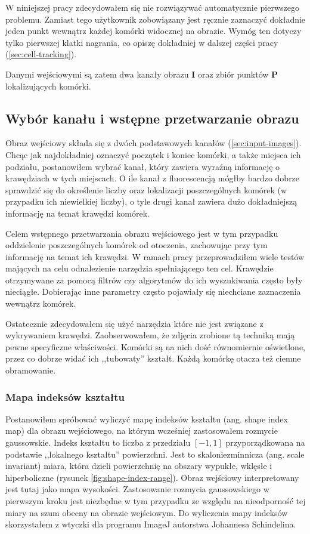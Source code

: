 \documentclass[declaration,shortabstract,mgr]{iithesis}
\newcommand{\image}{\mathbf{I}}
\begin{document}
W niniejszej pracy zdecydowałem się nie rozwiązywać automatycznie pierwszego problemu.
Zamiast tego użytkownik zobowiązany jest ręcznie zaznaczyć dokładnie jeden punkt wewnątrz każdej komórki widocznej na obrazie.
Wymóg ten dotyczy tylko pierwszej klatki nagrania, co opiszę dokładniej w dalszej części pracy (\ref{sec:cell-tracking}).

Danymi wejściowymi są zatem dwa kanały obrazu $\image$ oraz zbiór punktów $\mathbf{P}$ lokalizujących komórki.

\subsection{Wybór kanału i wstępne przetwarzanie obrazu}

Obraz wejściowy składa się z dwóch podstawowych kanałów (\ref{sec:input-images}).
Chcąc jak najdokładniej oznaczyć początek i koniec komórki, a także miejsca ich podziału, postanowiłem wybrać kanał, który zawiera wyraźną informację o krawędziach w tych miejscach.
O ile kanał z fluorescencją mógłby bardzo dobrze sprawdzić się do określenie liczby oraz lokalizacji poszczególnych komórek (w przypadku ich niewielkiej liczby), o tyle drugi kanał zawiera dużo dokładniejszą informację na temat krawędzi komórek.

Celem wstępnego przetwarzania obrazu wejściowego jest w tym przypadku oddzielenie poszczególnych komórek od otoczenia, zachowując przy tym informację na temat ich krawędzi. W ramach pracy przeprowadziłem wiele testów mających na celu odnalezienie narzędzia spełniającego ten cel. Krawędzie otrzymywane za pomocą filtrów czy algorytmów do ich wyszukiwania często były nieciągłe. Dobierając inne parametry często pojawiały się niechciane zaznaczenia wewnątrz komórek.

Ostatecznie zdecydowałem się użyć narzędzia które nie jest związane z wykrywaniem krawędzi. Zaobserwowałem, że zdjęcia zrobione tą techniką mają pewne specyficzne właściwości. Komórki są na nich dość równomiernie oświetlone, przez co dobrze widać ich ,,tubowaty'' kształt. Każdą komórkę otacza też ciemne obramowanie.

\subsubsection{Mapa indeksów kształtu}

Postanowiłem spróbować wyliczyć mapę indeksów kształtu (ang. shape index map) dla obrazu wejściowego, na którym wcześniej zastosowałem rozmycie gaussowskie. Indeks kształtu to liczba z przedziału $[-1, 1]$ przyporządkowana na podstawie ,,lokalnego kształtu'' powierzchni. Jest to skaloniezminnicza (ang. scale invariant) miara, która dzieli powierzchnię na obszary wypukłe, wklęsłe i hiperboliczne (rysunek \ref{fig:shape-index-range})\cite{paper:shape-index}. Obraz wejściowy interpretowany jest tutaj jako mapa wysokości. Zastosowanie rozmycia gaussowskiego w pierwszym kroku jest niezbędne w tym przypadku ze względu na nieodporność tej miary na szum obecny na obrazie wejściowym. Do wyliczenia mapy indeksów skorzystałem z wtyczki dla programu ImageJ autorstwa Johannesa Schindelina\cite{plugin:shape-index-map}.
\end{document}
